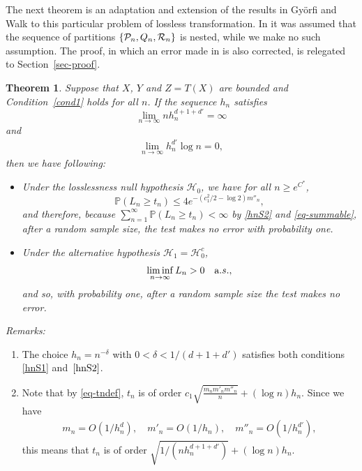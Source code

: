 \documentclass[11pt]{article}
\newtheorem{theorem}{Theorem}
\def\Q{Q}
\def\P{\mathcal{P}}
\def\PROB {{\mathbb P}}
\begin{document}
 
The next theorem is an adaptation and extension of the results in Gy\"orfi and Walk \cite{GyWa12} to this particular problem of  lossless transformation. In \cite{GyWa12} it was assumed that the  sequence of partitions $\{\P _n,\Q _n,{\cal R}_n\}$ is nested, while we make no such assumption.  The proof, in which an error made in \cite{GyWa12} is also corrected,  is relegated to Section~\ref{sec-proof}. 

\begin{theorem}
\label{coro0}
Suppose that $X$, $Y$ and $Z=T(X)$ are bounded and Condition~\ref{cond1} holds
for all $n$. If the   sequence $h_n$ satisfies 
\begin{equation}
\label{hnS1}
\lim _{n\to \infty}nh_n^{d+1+d'}= \infty
\end{equation}
and
\begin{align}
\label{hnS2}
\lim_{n\to \infty}h_n^{d'}\log n = 0,
\end{align}
then we have following: 
\begin{itemize}
\item[\rm{(a)}] 
Under the losslessness null hypothesis ${\mathcal H}_0$,
we have for all  $n\ge e^{C^*}$,
\begin{equation} 
\label{eq-summable}
\PROB(L_n \ge t_n) \le 4e^{-(c_1^2/2-\log 2) m''_n},
\end{equation}
and therefore, because $\sum_{n=1}^{\infty} \PROB(L_n \ge t_n)  <\infty$ by \eqref{hnS2} and \eqref{eq-summable},  after a random sample size,  the test makes  no error with probability one. 
\item[\rm{(b)}] 
Under the alternative hypothesis ${\mathcal H}_1={\mathcal H}_0^c$,
\[
\liminf_{n\to \infty} L_n>0  \quad {\text a.s.,}
\]
and so, with probability one,  after a random sample size the test makes no error. 
\end{itemize}
\end{theorem}

\noindent \emph{Remarks:} 
\vspace{-3pt}

\begin{enumerate}[label=(\roman*)] 
\item  
The  choice $h_n=n^{-\delta}$ with  $0<\delta< 1/(d+1+d')$  satisfies both conditions \eqref{hnS1} and~$\eqref{hnS2}$. 

\item Note that by \eqref{eq-tndef},  $t_n$ is of order $c_1 \sqrt{\frac{m_nm'_nm''_n}{n}}+(\log n)h_n$.
Since we have 
\begin{align*}
m_n=O(1/h_n^d), \quad m'_n=O(1/h_n), \quad m''_n=O(1/h_n^{d'}),
\end{align*}
this means that  $t_n$  is of order $\sqrt{1/(nh_n^{d+1+d'})}+(\log n)h_n$.

\end{enumerate} 
\end{document}
